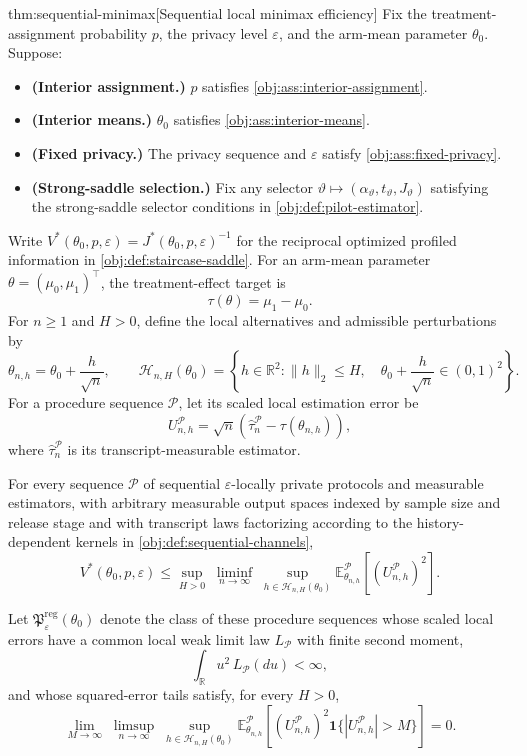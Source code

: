 \begin{theoremv}{thm:sequential-minimax}[Sequential local minimax efficiency]
Fix the treatment-assignment probability \(p\), the privacy level \(\varepsilon\), and the arm-mean parameter \(\theta_0\). Suppose:
\begin{itemize}
\item \textbf{(Interior assignment.)} \(p\) satisfies \cref{obj:ass:interior-assignment}.
\item \textbf{(Interior means.)} \(\theta_0\) satisfies \cref{obj:ass:interior-means}.
\item \textbf{(Fixed privacy.)} The privacy sequence and \(\varepsilon\) satisfy \cref{obj:ass:fixed-privacy}.
\item \textbf{(Strong-saddle selection.)} Fix any selector \(\vartheta\mapsto(\alpha_{\vartheta},t_{\vartheta},J_{\vartheta})\) satisfying the strong-saddle selector conditions in \cref{obj:def:pilot-estimator}.
\end{itemize}
Write \(V^*(\theta_0,p,\varepsilon)=J^*(\theta_0,p,\varepsilon)^{-1}\) for the reciprocal optimized profiled information in \cref{obj:def:staircase-saddle}. For an arm-mean parameter \(\theta=(\mu_0,\mu_1)^\top\), the treatment-effect target is
\[
\tau(\theta)=\mu_1-\mu_0.
\]
For \(n\ge1\) and \(H>0\), define the local alternatives and admissible perturbations by
\[
\theta_{n,h}=\theta_0+\frac{h}{\sqrt n},
\qquad
\mathcal H_{n,H}(\theta_0)
=
\left\{
h\in\mathbb R^2:
\|h\|_2\le H,\quad
\theta_0+\frac{h}{\sqrt n}\in(0,1)^2
\right\}.
\]
For a procedure sequence \(\mathcal P\), let its scaled local estimation error be
\[
U_{n,h}^{\mathcal P}
=
\sqrt n\left(
\widehat\tau_n^{\mathcal P}-\tau(\theta_{n,h})
\right),
\]
where \(\widehat\tau_n^{\mathcal P}\) is its transcript-measurable estimator.

For every sequence \(\mathcal P\) of sequential \(\varepsilon\)-locally private protocols and measurable estimators, with arbitrary measurable output spaces indexed by sample size and release stage and with transcript laws factorizing according to the history-dependent kernels in \cref{obj:def:sequential-channels},
\[
V^*(\theta_0,p,\varepsilon)
\le
\sup_{H>0}\;\liminf_{n\to\infty}\;
\sup_{h\in\mathcal H_{n,H}(\theta_0)}
\mathbb E_{\theta_{n,h}}^{\mathcal P}
\!\left[(U_{n,h}^{\mathcal P})^2\right].
\]

Let \(\mathfrak P^{\mathrm{reg}}_{\varepsilon}(\theta_0)\) denote the class of these procedure sequences whose scaled local errors have a common local weak limit law \(L_{\mathcal P}\) with finite second moment,
\[
\int_{\mathbb R}u^2\,L_{\mathcal P}(du)<\infty,
\]
and whose squared-error tails satisfy, for every \(H>0\),
\[
\lim_{M\to\infty}\;\limsup_{n\to\infty}\;
\sup_{h\in\mathcal H_{n,H}(\theta_0)}
\mathbb E_{\theta_{n,h}}^{\mathcal P}
\!\left[
(U_{n,h}^{\mathcal P})^2
\mathbf 1\{|U_{n,h}^{\mathcal P}|>M\}
\right]
=0.
\]


\end{theoremv}
